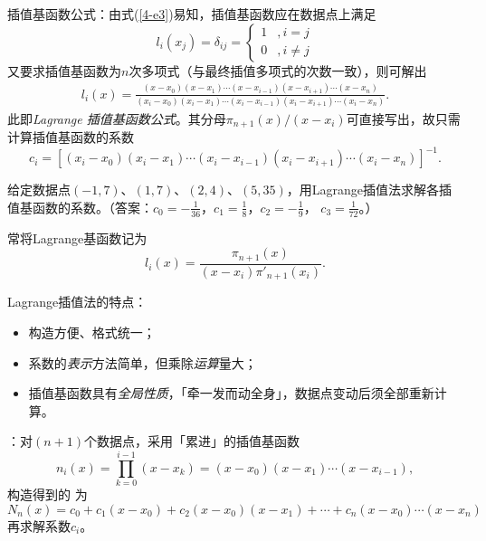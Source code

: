 \entry 插值基函数公式：由式(\ref{4-e3})易知，插值基函数应在数据点上满足
\begin{equation}
l_i(x_j)=\delta_{ij}=\begin{cases}1&,i=j\\0&,i\neq j\end{cases}
\end{equation}
又要求插值基函数为$n$次多项式（与最终插值多项式的次数一致），则可解出
\begin{gather}
l_i(x)=\frac{(x-x_0)(x-x_1)\cdots(x-x_{i-1})(x-x_{i+1})\cdots(x-x_n)}{(x_i-x_0)
(x_i-x_1)\cdots(x_i-x_{i-1})(x_i-x_{i+1})\cdots(x_i-x_n)}.
\end{gather}
此即\emph{Lagrange 插值基函数公式}。其分母$\pi_{n+1}(x)/(x-x_i)$可直接写出，故只需计算插值基函数的系数
\begin{equation}
c_i=\left[(x_i-x_0)(x_i-x_1)\cdots(x_i-x_{i-1})(x_i-x_{i+1})\cdots(x_i-x_n)\right]^{-1}.
\end{equation}

\example 给定数据点$(-1,7)$、$(1,7)$、$(2,4)$、$(5,35)$，用Lagrange插值法求解各插值基函数的系数。（答案：$c_0=-\frac1{36}$，$c_1=\frac18$，$c_2=-\frac19$，
$c_3=\frac1{72}$。）

\entry 常将Lagrange基函数记为
\begin{equation}
l_i(x)=\frac{\pi_{n+1}(x)}{(x-x_i)\pi'_{n+1}(x_i)}.
\end{equation}

\entry Lagrange插值法的特点：
\begin{itemize}\tl
    \item 构造方便、格式统一；
    \item 系数的\emph{表示}方法简单，但乘除\emph{运算}量大；
    \item 插值基函数具有\emph{全局性质}，「牵一发而动全身」，数据点变动后须全部重新计算。
\end{itemize}


\entry {}：对$(n+1)$个数据点，采用「累进」的插值基函数
\begin{equation}
n_i(x)=\prod_{k=0}^{i-1}(x-x_k)=(x-x_0)(x-x_1)\cdots(x-x_{i-1}),
\end{equation}
构造得到的 为
\begin{equation}\label{4-e4}
N_n(x)=c_0+c_1(x-x_0)+c_2(x-x_0)(x-x_1)+\cdots+c_n(x-x_0)\cdots(x-x_n)
\end{equation}
再求解系数$c_i$。

